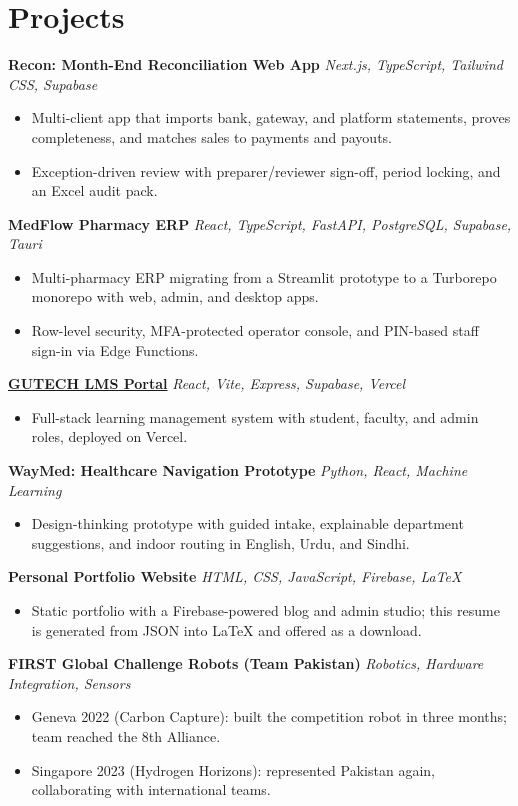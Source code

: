 \documentclass[10pt,a4paper]{article}
\newcommand{\project}[2]{%
  \textbf{#1} \hfill {\small\textit{#2}}\par}
\begin{document}
\section{Projects}
\project{Recon: Month-End Reconciliation Web App}{Next.js, TypeScript, Tailwind CSS, Supabase}
  \begin{itemize}
    \item Multi-client app that imports bank, gateway, and platform statements, proves completeness, and matches sales to payments and payouts.
    \item Exception-driven review with preparer/reviewer sign-off, period locking, and an Excel audit pack.
  \end{itemize}
\project{MedFlow Pharmacy ERP}{React, TypeScript, FastAPI, PostgreSQL, Supabase, Tauri}
  \begin{itemize}
    \item Multi-pharmacy ERP migrating from a Streamlit prototype to a Turborepo monorepo with web, admin, and desktop apps.
    \item Row-level security, MFA-protected operator console, and PIN-based staff sign-in via Edge Functions.
  \end{itemize}
\project{\href{https://gutech-lms-portal.vercel.app}{GUTECH LMS Portal}}{React, Vite, Express, Supabase, Vercel}
  \begin{itemize}
    \item Full-stack learning management system with student, faculty, and admin roles, deployed on Vercel.
  \end{itemize}
\project{WayMed: Healthcare Navigation Prototype}{Python, React, Machine Learning}
  \begin{itemize}
    \item Design-thinking prototype with guided intake, explainable department suggestions, and indoor routing in English, Urdu, and Sindhi.
  \end{itemize}
\project{Personal Portfolio Website}{HTML, CSS, JavaScript, Firebase, LaTeX}
  \begin{itemize}
    \item Static portfolio with a Firebase-powered blog and admin studio; this resume is generated from JSON into LaTeX and offered as a download.
  \end{itemize}
\project{FIRST Global Challenge Robots (Team Pakistan)}{Robotics, Hardware Integration, Sensors}
  \begin{itemize}
    \item Geneva 2022 (Carbon Capture): built the competition robot in three months; team reached the 8th Alliance.
    \item Singapore 2023 (Hydrogen Horizons): represented Pakistan again, collaborating with international teams.
  \end{itemize}
\end{document}
